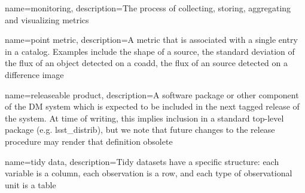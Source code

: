 {
  name={monitoring},
  description={The process of collecting, storing, aggregating and visualizing
  metrics}
}

{
  name={point metric},
  description={A \gls{metric} that is associated with a single entry in a
  catalog. Examples include the shape of a source, the standard deviation of
  the flux of an object detected on a coadd, the flux of an source detected on
  a difference image}
}

{
  name={releaseable product},
  description={A software package or other component of the DM system which
  is expected to be included in the next tagged release of the system. At time
  of writing, this implies inclusion in a standard top-level package
  (e.g. lsst\_distrib), but we note that future changes to the release procedure
  may render that definition obsolete}
}

{
  name={tidy data},
  description={Tidy datasets have a specific structure: each variable is a
  column, each observation is a row, and each type of observational unit is a
  table \citep{JSSv059i10}}
}
